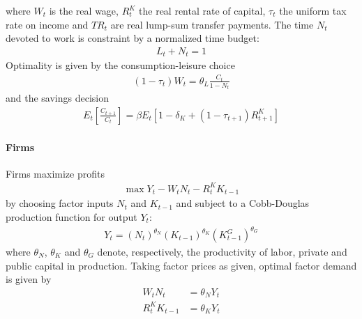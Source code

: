 where $W_t$ is the real wage, $R^K_t$ the real rental rate of capital, $\tau_t$ the uniform tax rate on income and $TR_t$ are real lump-sum transfer payments.
The time $N_t$ devoted to work is constraint by a normalized time budget:
\begin{align*}
L_t + N_t = 1
\end{align*}
Optimality is given by the consumption-leisure choice
\begin{align}
(1-\tau_t) W_t = \theta_L \frac{C_t}{1-N_t} \label{eq:BaxterKing:ConsumptionLeisure}
\end{align}
and the savings decision
\begin{align}
E_t \left[ \frac{C_{t+1}}{C_t}\right] = \beta E_t \left[ 1-\delta_K + (1-\tau_{t+1})R^K_{t+1}\right] \label{eq:BaxterKing:SavingsDecision}
\end{align}

\paragraph*{Firms}
Firms maximize profits
\begin{align*}
\max Y_t - W_t N_t - R^K_{t} K_{t-1}
\end{align*}
by choosing factor inputs $N_t$ and $K_{t-1}$ and subject to a Cobb-Douglas production function for output $Y_t$:
\begin{align}
Y_t = (N_t)^{\theta_N} (K_{t-1})^{\theta_K} (K_{t-1}^G)^{\theta_G} \label{eq:BaxterKing:CobbDouglasProductionFunction}
\end{align}
where $\theta_N$, $\theta_K$ and $\theta_G$ denote, respectively, the productivity of labor, private and public capital in production.
Taking factor prices as given, optimal factor demand is given by
\begin{align}
W_t N_t &= \theta_N Y_t \label{eq:BaxterKing:LaborDemand}\\
R^K_{t} K_{t-1}&= \theta_K Y_t \label{eq:BaxterKing:PrivateCapitalDemand}
\end{align}

